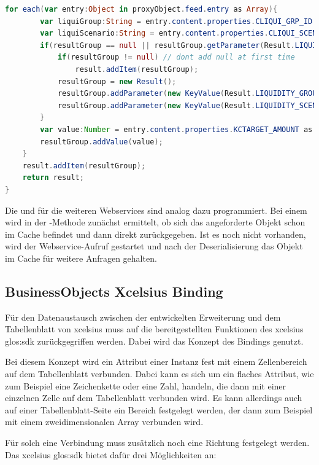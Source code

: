 \begin{onehalfspacing}
\begin{programm}[ht]
\begin{lstlisting}[language=ActionScript]
	for each(var entry:Object in proxyObject.feed.entry as Array){
		var liquiGroup:String = entry.content.properties.CLIQUI_GRP_ID as String;
		var liquiScenario:String = entry.content.properties.CLIQUI_SCENARIO as String;
		if(resultGroup == null || resultGroup.getParameter(Result.LIQUIDITY_GROUP) != liquiGroup || resultGroup.getParameter(Result.LIQUIDITY_SCENARIO) != liquiScenario){
			if(resultGroup != null) // dont add null at first time
				result.addItem(resultGroup);
			resultGroup = new Result();
			resultGroup.addParameter(new KeyValue(Result.LIQUIDITY_GROUP,liquiGroup));
			resultGroup.addParameter(new KeyValue(Result.LIQUIDITY_SCENARIO,liquiScenario));
		}
		var value:Number = entry.content.properties.KCTARGET_AMOUNT as Number;
		resultGroup.addValue(value);
	}
	result.addItem(resultGroup);
	return result;
}
\end{lstlisting}
\caption{Deserialisierung des XML-Formats in die interne Objektstruktur\label{listing:deserialisierung}}
\end{programm}


Die  und  für die weiteren Webservices sind analog dazu programmiert. Bei einem  wird in der -Methode zunächst ermittelt, ob sich das angeforderte Objekt schon im Cache befindet und dann direkt zurückgegeben. Ist es noch nicht vorhanden, wird der Webservice-Aufruf gestartet und nach der Deserialisierung das Objekt im Cache für weitere Anfragen gehalten.

\subsection{BusinessObjects Xcelsius Binding}
\label{sec:xcelsius_binding}
Für den Datenaustausch zwischen der entwickelten Erweiterung und dem Tabellenblatt von \gls{xcelsius} muss auf die bereitgestellten Funktionen des \gls{xcelsius} \gls{glos:sdk} zurückgegriffen werden. Dabei wird das Konzept des Bindings genutzt.

Bei diesem Konzept wird ein Attribut einer Instanz fest mit einem Zellenbereich auf dem Tabellenblatt verbunden. Dabei kann es sich um ein flaches Attribut, wie zum Beispiel eine Zeichenkette oder eine Zahl, handeln, die dann mit einer einzelnen Zelle auf dem Tabellenblatt verbunden wird. Es kann allerdings auch auf einer Tabellenblatt-Seite ein Bereich festgelegt werden, der dann zum Beispiel mit einem zweidimensionalen Array verbunden wird.

Für solch eine Verbindung muss zusätzlich noch eine Richtung festgelegt werden. Das \gls{xcelsius} \gls{glos:sdk} bietet dafür drei Möglichkeiten an:


\end{onehalfspacing}
